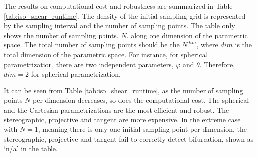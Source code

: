 \documentclass[12pt]{article}
\numberwithin{equation}{section}
\begin{document}
The results on computational cost and robustness are summarized in 
Table \ref{tab:iso_shear_runtime}. The density of the initial 
sampling grid is represented by the sampling interval and the number 
of sampling points. The table only shows the number of sampling 
points, $N$, along one dimension of the parametric space. The total 
number of sampling points should be the $N^{dim}$, where $dim$ is the 
total dimension of the parametric space. For instance, for spherical 
parametrization, there are two independent parameters, $\varphi$ and $
\theta$. Therefore, $dim=2$ for spherical parametrization.

It can be seen from Table \ref{tab:iso_shear_runtime}, as the number 
of sampling points $N$ per dimension decreases, so does the 
computational cost. The spherical and the Cartesian parametrizations 
are the most efficient and robust. The stereographic, projective and 
tangent are more expensive. In the extreme case with $N=1$, meaning 
there is only one initial sampling point per dimension, the 
stereographic, projective and tangent fail to correctly detect 
bifurcation, shown as `n/a' in the table. 
\end{document}
